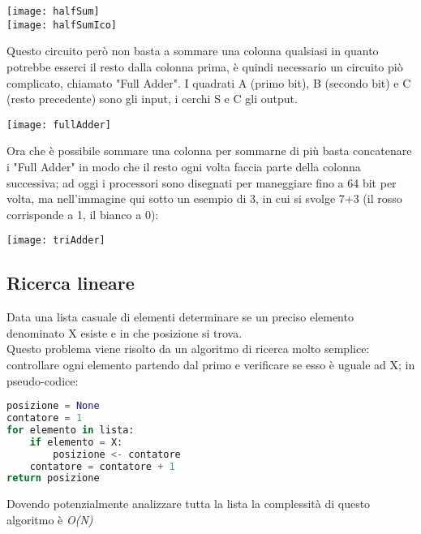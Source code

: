 \begin{center}
\texttt{[image: halfSum]}\\
\texttt{[image: halfSumIco]}
\end{center}
Questo circuito però non basta a sommare una colonna qualsiasi in quanto potrebbe esserci il resto dalla colonna prima, è quindi necessario un circuito piò complicato, chiamato "Full Adder". I quadrati A (primo bit), B (secondo bit) e C (resto precedente) sono gli input, i cerchi S e C gli output.
\begin{center}
\texttt{[image: fullAdder]}
\end{center}
Ora che è possibile sommare una colonna per sommarne di più basta concatenare i "Full Adder" in modo  che il resto ogni volta faccia parte della colonna successiva; ad oggi i processori sono disegnati per maneggiare fino a 64 bit per volta, ma nell'immagine qui sotto un esempio di 3, in cui si svolge 7+3 (il rosso corrisponde a 1, il bianco a 0):
\begin{center}
\texttt{[image: triAdder]}
\end{center}
\subsection{Ricerca lineare}
Data una lista casuale di elementi determinare se un preciso elemento denominato X esiste e in che posizione si trova.\\
Questo problema viene risolto da un algoritmo di ricerca molto semplice: controllare ogni elemento partendo dal primo e verificare se esso è uguale ad X; in pseudo-codice:
\begin{lstlisting}[language=python]
posizione = None
contatore = 1
for elemento in lista:
	if elemento = X:
		posizione <- contatore
	contatore = contatore + 1
return posizione
\end{lstlisting}
Dovendo potenzialmente analizzare tutta la lista la complessità di questo algoritmo è \textit{O(N)}
